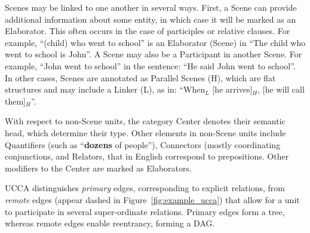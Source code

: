\documentclass[11pt,a4paper]{article}
\begin{document}
  Scenes may be linked to one another in several ways. First, a Scene can provide additional information about some entity,
  in which case it will be marked as an Elaborator. This often occurs in the case of participles or relative clauses.
  For example, ``(child) who went to school'' is an Elaborator (Scene)
  in ``The child who went to school is John''.
  A Scene may also be a Participant in another Scene. For example, ``John went to school'' in the sentence: ``He said John went to school''. 
  In other cases, Scenes are annotated as Parallel Scenes (H), which are flat structures and may include a Linker (L), 
  as in:  ``When$_L$ [he arrives]$_H$, [he will call them]$_H$''.

  With respect to non-Scene units, the category Center denotes their semantic head, which determine their type. 
  Other elements in non-Scene units include Quantifiers (such as ``{\bf dozens} of people''), Connectors (mostly
  coordinating conjunctions, and Relators, that in English correspond to prepositions.
  Other modifiers to the Center are marked as Elaborators.
  
  UCCA distinguishes \textit{primary} edges, corresponding 
  to explicit relations, from \textit{remote} edges (appear dashed in
  Figure~\ref{fig:example_ucca}) that allow for a unit to participate
  in several super-ordinate relations.
  Primary edges form a tree, whereas remote edges enable reentrancy, forming a DAG.




  

  
  
\end{document}
